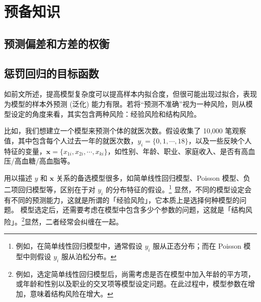 \vspace{10pt}

\section{预备知识}

\subsection{预测偏差和方差的权衡}

%


\subsection{惩罚回归的目标函数}\label{sec:Lasso-goal-function}

如前文所述，提高模型复杂度可以提高样本内拟合度，但很可能出现过拟合，表现为模型的样本外预测 (泛化) 能力有限。若将“预测不准确”视为一种风险，则从模型设定的角度来看，其实包含两种风险：经验风险和结构风险。

比如，我们想建立一个模型来预测个体的就医次数。假设收集了 10,000 笔观察值，其中包含每个人过去一年的就医次数，$y_i = \{0,1,\cdots,18\}$，以及一些反映个人特征的变量，$\mathbf{x} = \{x_{1i},x_{2i},\cdots,x_{ki}\}$，如性别、年龄、职业、家庭收入、是否有高血压/高血糖/高血脂等。

用以描述 $y$ 和 $\mathbf{x}$ 关系的备选模型很多，如简单线性回归模型、Poisson 模型、负二项回归模型等，区别在于对 $y_i$ 的分布特征的假设。\footnote{%
      例如，在简单线性回归模型中，通常假设 $y_i$ 服从正态分布；而在 Poisson 模型中则假设 $y_i$ 服从泊松分布。}
显然，不同的模型设定会有不同的预测能力，这就是所谓的「经验风险」，它本质上是选择何种模型的问题。
模型选定后，还需要考虑在模型中包含多少个参数的问题，这就是「结构风险」。\footnote{%
     例如，选定简单线性回归模型后，尚需考虑是否在模型中加入年龄的平方项，或年龄和性别以及职业的交叉项等模型设定问题。在此过程中，模型参数在增加，意味着结构风险在增大。 }显然，二者经常会纠缠在一起。

